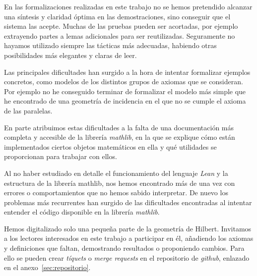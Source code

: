 En las formalizaciones realizadas en este trabajo no se hemos pretendido
alcanzar una síntesis y claridad óptima en las demostraciones, sino conseguir
que el sistema las acepte. Muchas de las pruebas pueden ser acortadas,
por ejemplo extrayendo partes a lemas adicionales para ser reutilizadas.
Seguramente no hayamos utilizado siempre las tácticas más adecuadas, habiendo
otras posibilidades más elegantes y claras de leer.

Las principales dificultades han surgido a la hora de intentar formalizar
ejemplos concretos, como modelos de los distintos grupos de axiomas que se
consideran. Por ejemplo no he conseguido terminar de formalizar el modelo más
simple que he encontrado de una geometría de incidencia en el que no se cumple
el axioma de las paralelas.

En parte atribuimos estas dificultades a la falta de una documentación más
completa y accesible de la librería \textit{mathlib}, en la que se explique cómo
están implementados ciertos objetos matemáticos en ella y qué utilidades se
proporcionan para trabajar con ellos.

Al no haber estudiado en detalle el funcionamiento del lenguaje \textit{Lean} y
la estructura de la librería mathlib, nos hemos encontrado más de una vez con
errores o comportamientos que no hemos sabido interpretar. De nuevo los
problemas más recurrentes han surgido de las dificultades encontradas al
intentar entender el código disponible en la librería \textit{mathlib}.

Hemos digitalizado solo una pequeña parte de la geometría de Hilbert. Invitamos
a los lectores interesados en este trabajo a participar en él, añadiendo los
axiomas y definiciones que faltan, demostrando resultados o proponiendo cambios.
Para ello se pueden crear \textit{tíquets} o \textit{merge requests} en el
repositorio de \textit{github}, enlazado en el anexo~\ref{sec:repositorio}.

